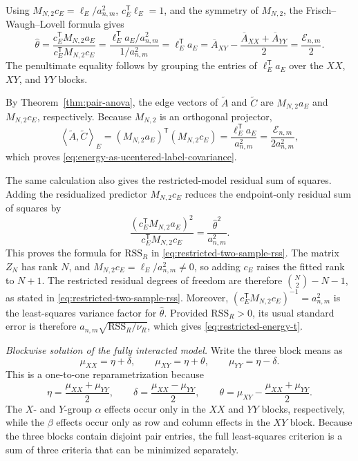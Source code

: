 \documentclass[11pt]{article}
\theoremstyle{plain}
\theoremstyle{definition}
\theoremstyle{remark}
\newcommand{\inner}[2]{\left\langle #1,#2\right\rangle}
\begin{document}
Using $M_{N,2}c_E=\ell_E/a_{n,m}^2$,
$c_E^\mathsf T\ell_E=1$, and the symmetry of $M_{N,2}$, the
Frisch--Waugh--Lovell formula gives
\[
 \widehat\theta
 =\frac{c_E^\mathsf TM_{N,2}a_E}
        {c_E^\mathsf TM_{N,2}c_E}
 =\frac{\ell_E^\mathsf Ta_E/a_{n,m}^2}
        {1/a_{n,m}^2}
 =\ell_E^\mathsf Ta_E
 =\overline A_{XY}-\frac{\overline A_{XX}+\overline A_{YY}}2
 =\frac{\mathcal E_{n,m}}2.
\]
The penultimate equality follows by grouping the entries of
$\ell_E^\mathsf Ta_E$ over the $XX$, $XY$, and $YY$ blocks.

By Theorem~\ref{thm:pair-anova}, the edge vectors of $\widetilde A$ and
$\widetilde C$ are $M_{N,2}a_E$ and $M_{N,2}c_E$, respectively.  Because
$M_{N,2}$ is an orthogonal projector,
\[
 \inner{\widetilde A}{\widetilde C}_E
 =(M_{N,2}a_E)^\mathsf T(M_{N,2}c_E)
 =\frac{\ell_E^\mathsf Ta_E}{a_{n,m}^2}
 =\frac{\mathcal E_{n,m}}{2a_{n,m}^2},
\]
which proves \eqref{eq:energy-as-ucentered-label-covariance}.

The same calculation also gives the restricted-model residual sum of
squares.  Adding the residualized predictor $M_{N,2}c_E$ reduces the
endpoint-only residual sum of squares by
\[
 \frac{(c_E^\mathsf TM_{N,2}a_E)^2}
      {c_E^\mathsf TM_{N,2}c_E}
 =\frac{\widehat\theta^2}{a_{n,m}^2}.
\]
This proves the formula for $\mathrm{RSS}_R$ in
\eqref{eq:restricted-two-sample-rss}.  The matrix $Z_N$ has rank $N$, and
$M_{N,2}c_E=\ell_E/a_{n,m}^2\ne0$, so adding $c_E$ raises the fitted rank to
$N+1$.  The restricted residual degrees of freedom are therefore
$\binom N2-N-1$, as stated in \eqref{eq:restricted-two-sample-rss}.  Moreover,
$(c_E^\mathsf TM_{N,2}c_E)^{-1}=a_{n,m}^2$ is the least-squares variance
factor for $\widehat\theta$.  Provided $\mathrm{RSS}_R>0$, its usual
standard error is therefore
$a_{n,m}\sqrt{\mathrm{RSS}_R/\nu_R}$, which gives
\eqref{eq:restricted-energy-t}.

\smallskip
\noindent\emph{Blockwise solution of the fully interacted model.}
Write the three block means as
\[
 \mu_{XX}=\eta+\delta,
 \qquad
 \mu_{XY}=\eta+\theta,
 \qquad
 \mu_{YY}=\eta-\delta.
\]
This is a one-to-one reparametrization because
\[
 \eta=\frac{\mu_{XX}+\mu_{YY}}2,
 \qquad
 \delta=\frac{\mu_{XX}-\mu_{YY}}2,
 \qquad
 \theta=\mu_{XY}-\frac{\mu_{XX}+\mu_{YY}}2.
\]
The $X$- and $Y$-group $\alpha$ effects occur only in the $XX$ and $YY$
blocks, respectively, while the $\beta$ effects occur only as row and column
effects in the $XY$ block.  Because the three blocks contain disjoint pair
entries, the full least-squares criterion is a sum of three criteria that can
be minimized separately.
\end{document}

